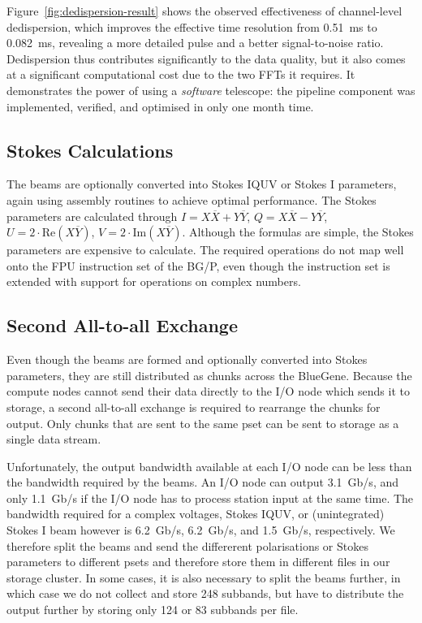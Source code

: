 \documentclass{llncs}
\begin{document}
Figure~\ref{fig:dedispersion-result} shows the observed effectiveness of channel-level dedispersion, which improves the effective time resolution from 0.51~ms to 0.082~ms, revealing a more detailed pulse and a better signal-to-noise ratio. Dedispersion thus contributes significantly to the data quality, but it also comes at a significant computational cost due to the two FFTs it requires. It demonstrates the power of using a \emph{software\/} telescope: the pipeline component was implemented, verified, and optimised in only one month time.

\subsection{Stokes Calculations}

The beams are optionally converted into Stokes IQUV or Stokes I parameters, again using assembly routines to achieve optimal performance. The Stokes parameters are calculated through $I = X\overline{X} + Y\overline{Y}$, $Q = X\overline{X} - Y\overline{Y}$, $U = 2\cdot\mathrm{Re}(X\overline{Y})$, $V = 2\cdot\mathrm{Im}(X\overline{Y})$. Although the formulas are simple, the Stokes parameters are expensive to calculate. The required operations do not map well onto the FPU instruction set of the BG/P, even though the instruction set is extended with support for operations on complex numbers.

\subsection{Second All-to-all Exchange}

Even though the beams are formed and optionally converted into Stokes parameters, they are still distributed as chunks across the BlueGene. Because the compute nodes cannot send their data directly to the I/O node which sends it to storage, a second all-to-all exchange is required to rearrange the chunks for output. Only chunks that are sent to the same pset can be sent to storage as a single data stream.

Unfortunately, the output bandwidth available at each I/O node can be less than the bandwidth required by the beams. An I/O node can output 3.1~Gb/s, and only 1.1~Gb/s if the I/O node has to process station input at the same time. The bandwidth required for a complex voltages, Stokes IQUV, or (unintegrated) Stokes I beam however is 6.2~Gb/s, 6.2~Gb/s, and 1.5~Gb/s, respectively. We therefore split the beams and send the differerent polarisations or Stokes parameters to different psets and therefore store them in different files in our storage cluster. In some cases, it is also necessary to split the beams further, in which case we do not collect and store 248 subbands, but have to distribute the output further by storing only 124 or 83 subbands per file.
\end{document}
